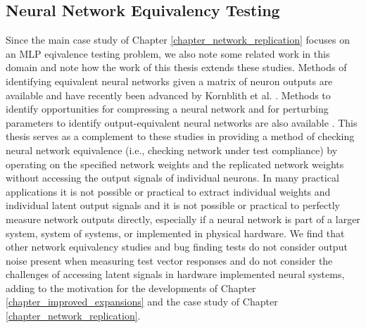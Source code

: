 \subsection{Neural Network Equivalency Testing}
Since the main case study of Chapter \ref{chapter_network_replication}
focuses on an MLP eqivalence testing problem, we also note some related work in this domain and note how the work of this thesis extends these studies.
Methods of identifying equivalent neural networks given
a matrix of neuron outputs are available
\cite{laakso_content_2000,li_convergent_2015,raghu_svcca_2017,morcos_insights_2018}
and have recently been advanced by Kornblith et al.
\cite{kornblith_similarity_2019}.
Methods to identify opportunities for compressing a neural
network \cite{chang_deep_2015,huang_ltnn_2019} and for
perturbing parameters to identify output-equivalent
neural networks are also available \cite{dimattina_how_2010}.
This thesis serves as a complement to these studies in providing
a method of checking neural network equivalence (i.e., checking
network under test compliance) by operating on the specified
network weights and the replicated network weights without
accessing the output signals of individual neurons.  In many practical applications it is not possible or practical to extract individual weights and individual latent output signals and it is not possible or practical to perfectly measure network outputs directly, especially if a neural network is part of a larger system, system of systems, or implemented in physical hardware.  We
find that other network equivalency studies and bug finding tests do not
consider output noise present when measuring test vector
responses and do not consider the challenges of accessing latent signals in hardware implemented neural systems, adding to the motivation for the developments of Chapter \ref{chapter_improved_expansions} and the case study of Chapter \ref{chapter_network_replication}.

